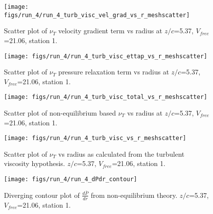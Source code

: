 \begin{figure}[H]
\centering
\texttt{[image: figs/run\_4/run\_4\_turb\_visc\_vel\_grad\_vs\_r\_meshscatter]}
\caption{Scatter plot of $\nu_T$ velocity gradient term vs radius at $z/c$=5.37, $V_{free}$=21.06, station 1.}
\end{figure}


\begin{figure}[H]
\centering
\texttt{[image: figs/run\_4/run\_4\_turb\_visc\_ettap\_vs\_r\_meshscatter]}
\caption{Scatter plot of $\nu_T$ pressure relaxation term vs radius at $z/c$=5.37, $V_{free}$=21.06, station 1.}
\end{figure}


\begin{figure}[H]
\centering
\texttt{[image: figs/run\_4/run\_4\_turb\_visc\_total\_vs\_r\_meshscatter]}
\caption{Scatter plot of non-equilibrium based $\nu_T$ vs radius at $z/c$=5.37, $V_{free}$=21.06, station 1.}
\end{figure}


\begin{figure}[H]
\centering
\texttt{[image: figs/run\_4/run\_4\_turb\_visc\_vs\_r\_meshscatter]}
\caption{Scatter plot of $\nu_T$ vs radius as calculated from the turbulent viscosity hypothesis. $z/c$=5.37, $V_{free}$=21.06, station 1.}
\end{figure}


\begin{figure}[H]
\centering
\texttt{[image: figs/run\_4/run\_4\_dPdr\_contour]}
\caption{Diverging contour plot of $\frac{d\bar{P}}{dr}$ from non-equilibrium theory. $z/c$=5.37, $V_{free}$=21.06, station 1.}
\end{figure}


